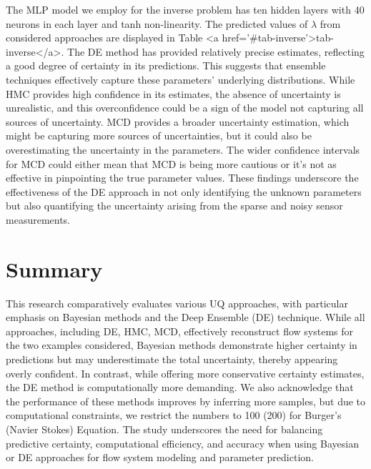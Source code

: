 \documentclass{article}
\begin{document}
The MLP model we employ for the inverse problem has ten hidden layers with 40 neurons in each layer and tanh non-linearity.
The predicted values of $\lambda$ from considered approaches are displayed in Table <a href='#tab-inverse'>tab-inverse</a>.
The DE method has provided relatively precise estimates, reflecting a good degree of certainty in its predictions. This suggests that ensemble techniques effectively capture these parameters’ underlying distributions. While HMC provides high confidence in its estimates, the absence of uncertainty is unrealistic, and this overconfidence could be a sign of the model not capturing all sources of uncertainty. MCD provides a broader uncertainty estimation, which might be capturing more sources of uncertainties, but it could also be overestimating the uncertainty in the parameters. The wider confidence intervals for MCD could either mean that MCD is being more cautious or it’s not as effective in pinpointing the true parameter values.
These findings underscore the effectiveness of the DE approach in not only identifying the unknown parameters but also quantifying the uncertainty arising from the sparse and noisy sensor measurements.


\section{Summary}
This research comparatively evaluates various UQ approaches, with particular emphasis on Bayesian methods and the Deep Ensemble (DE) technique. While all approaches, including DE, HMC, MCD, effectively reconstruct flow systems for the two examples considered, Bayesian methods demonstrate higher certainty in predictions but may underestimate the total uncertainty, thereby appearing overly confident. In contrast, while offering more conservative certainty estimates, the DE method is computationally more demanding. We also acknowledge that the performance of these methods improves by inferring more samples, but due to computational constraints, we restrict the numbers to 100 (200) for Burger's (Navier Stokes) Equation. The study underscores the need for balancing predictive certainty, computational efficiency, and accuracy when using Bayesian or DE approaches for flow system modeling and parameter prediction. 


\end{document}
